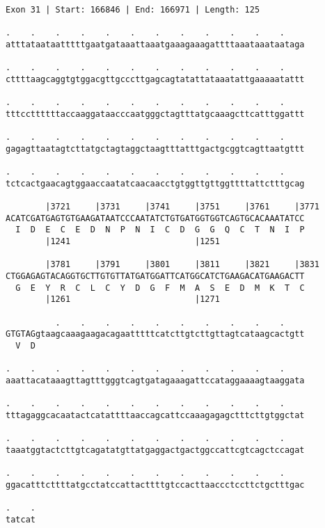 \documentclass{article}
\begin{document}
\begin{Verbatim}
Exon 31 | Start: 166846 | End: 166971 | Length: 125
 
.    .    .    .    .    .    .    .    .    .    .    .    
atttataataatttttgaatgataaattaaatgaaagaaagattttaaataaataataga
  
.    .    .    .    .    .    .    .    .    .    .    .    
cttttaagcaggtgtggacgttgcccttgagcagtatattataaatattgaaaaatattt
  
.    .    .    .    .    .    .    .    .    .    .    .    
tttccttttttaccaaggataacccaatgggctagtttatgcaaagcttcatttggattt
  
.    .    .    .    .    .    .    .    .    .    .    .    
gagagttaatagtcttatgctagtaggctaagtttatttgactgcggtcagttaatgttt
  
.    .    .    .    .    .    .    .    .    .    .    .    
tctcactgaacagtggaaccaatatcaacaacctgtggttgttggttttattctttgcag
  
        |3721     |3731     |3741     |3751     |3761     |3771
ACATCGATGAGTGTGAAGATAATCCCAATATCTGTGATGGTGGTCAGTGCACAAATATCC
  I  D  E  C  E  D  N  P  N  I  C  D  G  G  Q  C  T  N  I  P
        |1241                         |1251                 
  
        |3781     |3791     |3801     |3811     |3821     |3831
CTGGAGAGTACAGGTGCTTGTGTTATGATGGATTCATGGCATCTGAAGACATGAAGACTT
  G  E  Y  R  C  L  C  Y  D  G  F  M  A  S  E  D  M  K  T  C
        |1261                         |1271                 
  
          .    .    .    .    .    .    .    .    .    .    
GTGTAGgtaagcaaagaagacagaatttttcatcttgtcttgttagtcataagcactgtt
  V  D                                                      
  
.    .    .    .    .    .    .    .    .    .    .    .    
aaattacataaagttagtttgggtcagtgatagaaagattccataggaaaagtaaggata
  
.    .    .    .    .    .    .    .    .    .    .    .    
tttagaggcacaatactcatattttaaccagcattccaaagagagctttcttgtggctat
  
.    .    .    .    .    .    .    .    .    .    .    .    
taaatggtactcttgtcagatatgttatgaggactgactggccattcgtcagctccagat
  
.    .    .    .    .    .    .    .    .    .    .    .    
ggacatttcttttatgcctatccattacttttgtccacttaaccctccttctgctttgac
  
.    .
tatcat
\end{Verbatim}
\newpage
\end{document}
